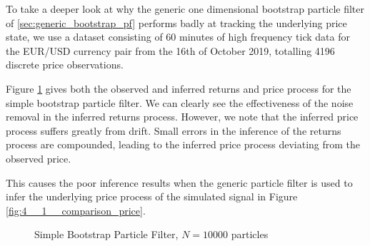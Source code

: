 \documentclass[../main.tex]{subfiles}
\begin{document}
To take a deeper look at why the generic one dimensional bootstrap particle filter of \autoref{sec:generic_bootstrap_pf} performs badly at tracking the underlying price state, we use a dataset consisting of 60 minutes of high frequency tick data for the EUR/USD currency pair from the 16th of October 2019, totalling 4196 discrete price observations. 

Figure \ref{fig:4__1__1__bootstrap_PF} gives both the observed and inferred returns and price process for the simple bootstrap particle filter. We can clearly see the effectiveness of the noise removal in the inferred returns process. However, we note that the inferred price process suffers greatly from drift. Small errors in the inference of the returns process are compounded, leading to the inferred price process deviating from the observed price. 

This causes the poor inference results when the generic particle filter is used to infer the underlying price process of the simulated signal in Figure \ref{fig:4__1__comparison_price}.

\begin{figure}[h!]
	\centering
	\qquad
	\caption{Simple Bootstrap Particle Filter, $N = 10000$ particles}
	\label{fig:4__1__1__bootstrap_PF}
\end{figure}
\end{document}
